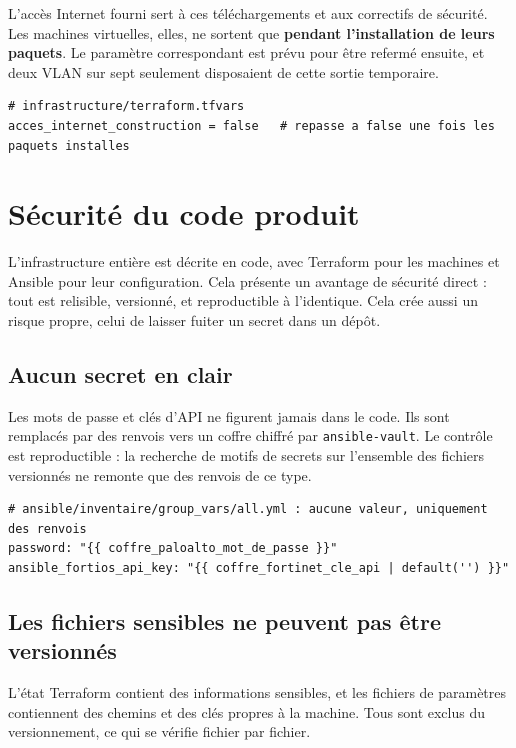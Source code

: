 \documentclass[11pt,a4paper]{article}
\newcommand{\ttb}[1]{\texttt{\small #1}}
\begin{document}
L'accès Internet fourni sert à ces téléchargements et aux correctifs de sécurité.
Les machines virtuelles, elles, ne sortent que \textbf{pendant l'installation de
leurs paquets}. Le paramètre correspondant est prévu pour être refermé ensuite, et
deux VLAN sur sept seulement disposaient de cette sortie temporaire.

\begin{lstlisting}
# infrastructure/terraform.tfvars
acces_internet_construction = false   # repasse a false une fois les paquets installes
\end{lstlisting}

\section{Sécurité du code produit}

L'infrastructure entière est décrite en code, avec Terraform pour les machines et
Ansible pour leur configuration. Cela présente un avantage de sécurité direct :
tout est relisible, versionné, et reproductible à l'identique. Cela crée aussi un
risque propre, celui de laisser fuiter un secret dans un dépôt.

\subsection*{Aucun secret en clair}

Les mots de passe et clés d'API ne figurent jamais dans le code. Ils sont
remplacés par des renvois vers un coffre chiffré par \ttb{ansible-vault}. Le
contrôle est reproductible : la recherche de motifs de secrets sur l'ensemble des
fichiers versionnés ne remonte que des renvois de ce type.

\begin{lstlisting}
# ansible/inventaire/group_vars/all.yml : aucune valeur, uniquement des renvois
password: "{{ coffre_paloalto_mot_de_passe }}"
ansible_fortios_api_key: "{{ coffre_fortinet_cle_api | default('') }}"
\end{lstlisting}

\subsection*{Les fichiers sensibles ne peuvent pas être versionnés}

L'état Terraform contient des informations sensibles, et les fichiers de
paramètres contiennent des chemins et des clés propres à la machine. Tous sont
exclus du versionnement, ce qui se vérifie fichier par fichier.
\end{document}
